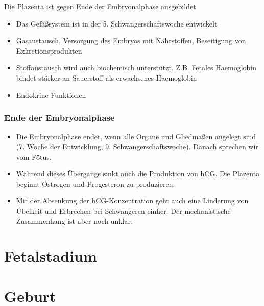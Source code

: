 \documentclass{beamer}
\begin{document}
\begin{frame}{Die Plazenta ist gegen Ende der Embryonalphase ausgebildet}

\begin{itemize}
    \item 
    Das Gefäßsystem ist in der 5. Schwangerschaftswoche entwickelt
    \item
    Gasaustausch, Versorgung des Embryos mit Nährstoffen, Beseitigung von Exkretionsprodukten
    \item
    Stoffaustausch wird auch biochemisch unterstützt. Z.B.
    Fetales Haemoglobin bindet stärker an Sauerstoff als erwachsenes Haemoglobin 
    \item
    Endokrine Funktionen

\end{itemize}




    
\end{frame}




\begin{frame}
\frametitle{Ende der Embryonalphase}
\begin{itemize}
    \item 
    Die Embryonalphase endet, wenn alle Organe und Gliedmaßen angelegt sind (7. Woche der Entwicklung, 9. Schwangerschaftswoche). Danach sprechen wir vom Fötus.  

\pause
\item 
Während dieses Übergangs sinkt auch die Produktion von hCG. Die Plazenta beginnt Östrogen und Progesteron zu produzieren. 


\pause
\item 
Mit der Absenkung der hCG-Konzentration geht auch eine Linderung von Übelkeit und Erbrechen bei Schwangeren einher. Der mechanistische Zusammenhang ist aber noch unklar.


    
\end{itemize}


 
\end{frame}

  
\section{Fetalstadium}

\section{Geburt}
\end{document}
